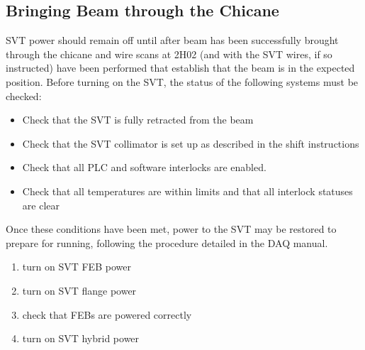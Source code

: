 \documentclass[12pt]{report}
\begin{document}
\subsection{Bringing Beam through the Chicane}
SVT power should remain off until after beam has been successfully brought through the chicane and wire scans at 2H02 (and with the SVT wires, if so instructed) have been performed that establish that the beam is in the expected position. Before turning on the SVT, the status of the following systems must be checked:

\begin{itemize}
\item Check that the SVT is fully retracted from the beam
\item Check that the SVT collimator is set up as described in the shift instructions
\item Check that all PLC and software interlocks are enabled.
\item Check that all temperatures are within limits and that all interlock statuses are clear
\end{itemize}

Once these conditions have been met, power to the SVT may be restored to prepare for running, following the procedure detailed in the DAQ manual.
\begin{enumerate}
\item turn on  SVT FEB power
\item turn on  SVT flange power
\item check that FEBs are powered correctly
\item turn on SVT hybrid power
\end{enumerate}

\end{document}
